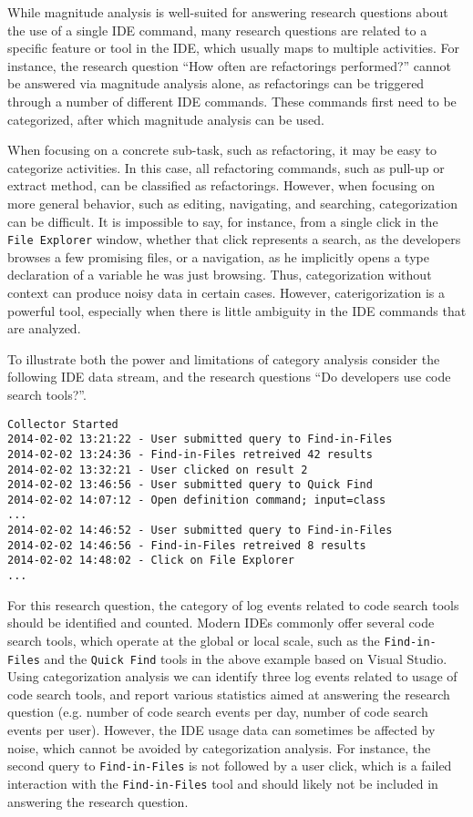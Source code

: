 While magnitude analysis is well-suited for answering research questions about the use of a single IDE command, many research questions are related to a specific feature or tool in the IDE, which usually maps to multiple activities. For instance, the research question ``How often are refactorings performed?'' cannot be answered via magnitude analysis alone, as refactorings can be triggered through a number of different IDE commands. These commands first need to be categorized, after which magnitude analysis can be used. 

When focusing on a concrete sub-task, such as refactoring, it may be easy to categorize activities. In this case, all refactoring commands, such as pull-up or extract method, can be classified as refactorings. However, when focusing on more general behavior, such as editing, navigating, and searching, categorization can be difficult. It is impossible to say, for instance, from a single click in the {\tt File Explorer} window, whether that click represents a search, as the developers browses a few promising files, or a navigation, as he implicitly opens a type declaration of a variable he was just browsing. Thus, categorization without context can produce noisy data in certain cases. However, caterigorization is a powerful tool, especially when there is little ambiguity in the IDE commands that are analyzed.

To illustrate both the power and limitations of category analysis consider the following IDE data stream, and the research questions ``Do developers use code search tools?''. 

\begin{verbatim}
Collector Started
2014-02-02 13:21:22 - User submitted query to Find-in-Files
2014-02-02 13:24:36 - Find-in-Files retreived 42 results
2014-02-02 13:32:21 - User clicked on result 2
2014-02-02 13:46:56 - User submitted query to Quick Find
2014-02-02 14:07:12 - Open definition command; input=class
...
2014-02-02 14:46:52 - User submitted query to Find-in-Files
2014-02-02 14:46:56 - Find-in-Files retreived 8 results
2014-02-02 14:48:02 - Click on File Explorer
...
\end{verbatim}

For this research question, the category of log events related to code search tools should be identified and counted. Modern IDEs commonly offer several code search tools, which operate at the global or local scale, such as the {\tt Find-in-Files} and
the {\tt Quick Find} tools in the above example based on Visual Studio. Using categorization analysis we can identify three
log events related to usage of code search tools, and report various statistics aimed at answering the research question (e.g. number of code search events per day, number of code search events per user). However, the IDE usage data can sometimes be affected by noise, which cannot be avoided by categorization analysis. For instance, the second query to {\tt Find-in-Files} is not followed by a user click, which is a failed interaction with the {\tt Find-in-Files} tool and should likely not be included in answering the research question.


